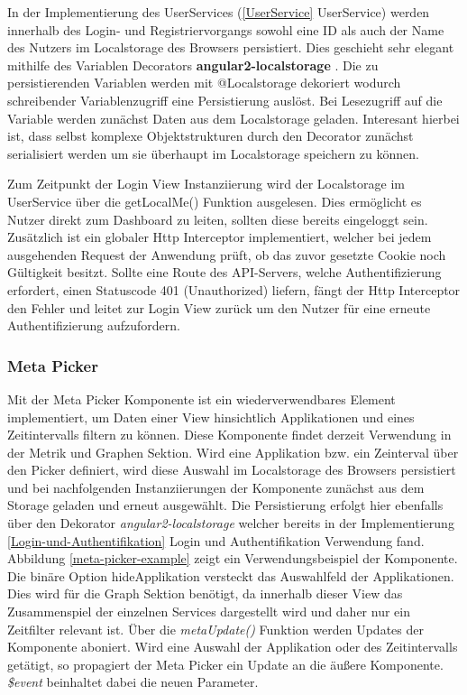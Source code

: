In der Implementierung des UserServices (\ref{UserService} UserService) werden innerhalb des Login- und Registriervorgangs
sowohl eine ID als auch der Name des Nutzers im Localstorage des Browsers persistiert.
Dies geschieht sehr elegant mithilfe des Variablen Decorators \textbf{angular2-localstorage} \cite{marcj95:online}.
Die zu persistierenden Variablen werden mit @Localstorage dekoriert wodurch schreibender Variablenzugriff eine Persistierung auslöst.
Bei Lesezugriff auf die Variable werden zunächst Daten aus dem Localstorage geladen.
Interesant hierbei ist, dass selbst komplexe Objektstrukturen durch den Decorator zunächst serialisiert werden um sie überhaupt im Localstorage speichern zu können.

Zum Zeitpunkt der Login View Instanziierung wird der Localstorage im UserService über die getLocalMe() Funktion ausgelesen.
Dies ermöglicht es Nutzer direkt zum Dashboard zu leiten, sollten diese bereits eingeloggt sein.
Zusätzlich ist ein globaler Http Interceptor implementiert, welcher bei jedem ausgehenden Request der Anwendung prüft, ob das zuvor gesetzte Cookie noch Gültigkeit besitzt.
Sollte eine Route des \ac{API}-Servers, welche Authentifizierung erfordert, einen Statuscode 401 (Unauthorized) liefern,
fängt der Http Interceptor den Fehler und leitet zur Login View zurück um den Nutzer für eine erneute Authentifizierung aufzufordern.




\subsubsection{Meta Picker}

Mit der Meta Picker Komponente ist ein wiederverwendbares Element implementiert, um Daten einer View hinsichtlich Applikationen und eines Zeitintervalls filtern zu können.
Diese Komponente findet derzeit Verwendung in der Metrik und Graphen Sektion. Wird eine Applikation bzw. ein Zeinterval über den Picker definiert,
wird diese Auswahl im Localstorage des Browsers persistiert und bei nachfolgenden Instanziierungen der Komponente zunächst aus dem Storage geladen und erneut ausgewählt.
Die Persistierung erfolgt hier ebenfalls über den Dekorator \emph{angular2-localstorage}
welcher bereits in der Implementierung \ref{Login-und-Authentifikation} Login und Authentifikation Verwendung fand.
Abbildung \ref{meta-picker-example} zeigt ein Verwendungsbeispiel der Komponente.
Die binäre Option hideApplikation versteckt das Auswahlfeld der Applikationen. Dies wird für die Graph Sektion benötigt,
da innerhalb dieser View das Zusammenspiel der einzelnen Services dargestellt wird und daher nur ein Zeitfilter relevant ist.
Über die \emph{metaUpdate()} Funktion werden Updates der Komponente aboniert. Wird eine Auswahl der Applikation oder des Zeitintervalls getätigt,
so propagiert der Meta Picker ein Update an die äußere Komponente. \emph{\$event} beinhaltet dabei die neuen Parameter.


